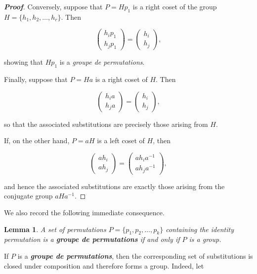 \documentclass[a4paper,11pt]{article}
\newtheorem{lemma}{Lemma}
\begin{document}
\begin{proof}[\normalfont\bfseries Proof]
	Conversely, suppose that \(P=Hp_1\) is a right coset of the group
	\(H=\{h_1,h_2,\dots,h_r\}\). Then
	
	\[
	\left(
	\begin{array}{c}
		h_ip_1\\
		h_jp_1
	\end{array}
	\right)
	=
	\left(
	\begin{array}{c}
		h_i\\
		h_j
	\end{array}
	\right),
	\]
	
	showing that \(Hp_1\) is a \textit{groupe de permutations}.
	
	Finally, suppose that \(P=Ha\) is a right coset of \(H\). Then
	
	\[
	\left(
	\begin{array}{c}
		h_ia\\
		h_ja
	\end{array}
	\right)
	=
	\left(
	\begin{array}{c}
		h_i\\
		h_j
	\end{array}
	\right),
	\]
	
	so that the associated substitutions are precisely those arising from \(H\).
	
	If, on the other hand, \(P=aH\) is a left coset of \(H\), then
	
	\[
	\left(
	\begin{array}{c}
		ah_i\\
		ah_j
	\end{array}
	\right)
	=
	\left(
	\begin{array}{c}
		ah_ia^{-1}\\
		ah_ja^{-1}
	\end{array}
	\right),
	\]
	
	and hence the associated substitutions are exactly those arising from the conjugate group \(aHa^{-1}\).
	
\end{proof}

We also record the following immediate consequence.

\begin{lemma}
	\label{lem:twee}
	A set of permutations \(P=\{p_1,p_2,\dots,p_k\}\) containing the identity permutation is a \textbf{\textit{groupe de permutations}} if and only if \(P\) is a group.
\end{lemma}

If \(P\) is a \textbf{\textit{groupe de permutations}}, then the corresponding set of substitutions is closed under composition and therefore forms a group. Indeed, let
\end{document}
